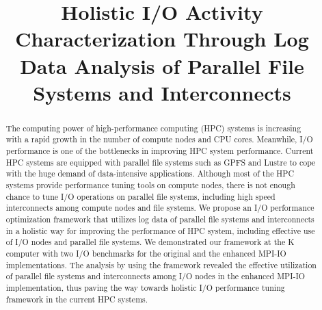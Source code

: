 \documentclass{jhps}
\begin{document}



\title{Holistic I/O Activity Characterization Through Log Data Analysis of Parallel File Systems and Interconnects}


\maketitle

\begin{abstract}
The computing power of high-performance computing (HPC) systems is increasing
with a rapid growth in the number of compute nodes and CPU cores.
Meanwhile, I/O performance is one of the bottlenecks in improving HPC system performance.
Current HPC systems are equipped with parallel file systems such as GPFS and Lustre
to cope with the huge demand of data-intensive applications.
Although most of the HPC systems provide performance tuning tools on compute nodes,
there is not enough chance to tune I/O operations on parallel file systems,
including high speed interconnects among compute nodes and file systems.
We propose an I/O performance optimization framework that utilizes log data of
parallel file systems and interconnects in a holistic way
for improving the performance of HPC system, including effective use
of I/O nodes and parallel file systems.
We demonstrated our framework at the K computer with two I/O benchmarks
for the original and the enhanced MPI-IO implementations.
The analysis by using the framework revealed the effective utilization of
parallel file systems and interconnects among I/O nodes
in the enhanced MPI-IO implementation,
thus paving the way towards holistic I/O performance tuning framework
in the current HPC systems.
\end{abstract}
\end{document}
